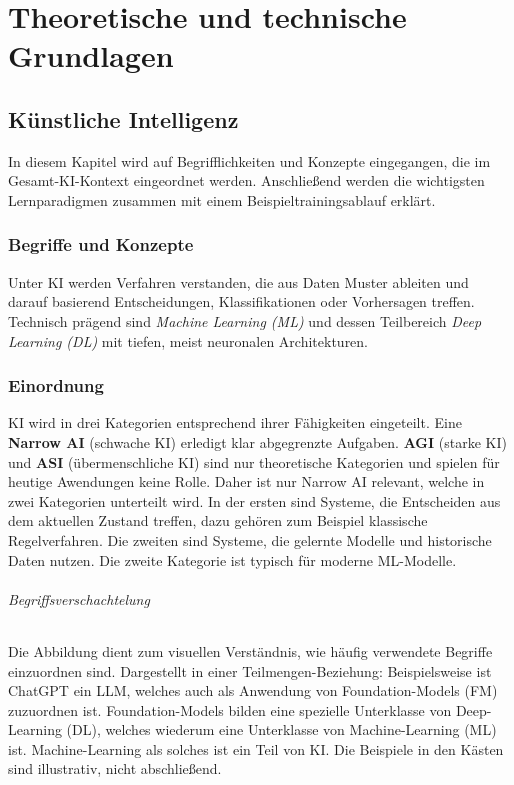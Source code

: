\part{Theoretische und technische Grundlagen}

\chapter{Künstliche Intelligenz}\label{sec:grundlagen-ki}
In diesem Kapitel wird auf Begrifflichkeiten und Konzepte eingegangen, die im Gesamt-KI-Kontext 
eingeordnet werden. Anschließend werden die wichtigsten Lernparadigmen zusammen mit einem 
Beispieltrainingsablauf erklärt.

\section{Begriffe und Konzepte}\label{sec:begriffe-konzepte}
Unter KI werden Verfahren verstanden, die aus Daten Muster ableiten
und darauf basierend Entscheidungen, Klassifikationen oder Vorhersagen treffen. Technisch prägend sind
\emph{Machine Learning (ML)} und dessen Teilbereich \emph{Deep Learning (DL)} mit tiefen, meist
neuronalen Architekturen. 

\section{Einordnung}\label{sec:ki-einordnung}
KI wird in drei Kategorien entsprechend ihrer Fähigkeiten eingeteilt. Eine 
\textbf{Narrow AI} (schwache KI) erledigt klar abgegrenzte Aufgaben. 
\textbf{AGI} (starke KI) und \textbf{ASI} (übermenschliche KI) sind nur theoretische Kategorien und
spielen für heutige Awendungen keine Rolle. Daher ist nur Narrow AI relevant, welche in zwei Kategorien unterteilt wird. 
In der ersten sind Systeme, die Entscheiden aus dem aktuellen Zustand treffen, dazu gehören zum Beispiel klassische Regelverfahren.
Die zweiten sind Systeme, die gelernte Modelle und historische Daten nutzen. Die zweite Kategorie ist typisch für moderne ML-Modelle.

\paragraph{Begriffsverschachtelung}
Die Abbildung dient zum visuellen Verständnis, wie häufig verwendete Begriffe einzuordnen sind. 
Dargestellt in einer Teilmengen-Beziehung:
Beispielsweise ist ChatGPT ein LLM, welches auch als Anwendung von Foundation-Models (FM) zuzuordnen ist. 
Foundation-Models bilden eine spezielle Unterklasse von Deep-Learning (DL), welches wiederum 
eine Unterklasse von Machine-Learning (ML) ist. Machine-Learning als solches ist ein Teil von KI.
Die Beispiele in den Kästen sind illustrativ, nicht abschließend.


